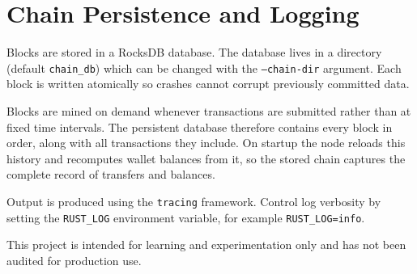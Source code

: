\chapter{Chain Persistence and Logging}
Blocks are stored in a RocksDB database. The database lives in a directory (default \texttt{chain\_db}) which can be changed with the \texttt{--chain-dir} argument. Each block is written atomically so crashes cannot corrupt previously committed data.

Blocks are mined on demand whenever transactions are submitted rather than at fixed time intervals. The persistent database therefore contains every block in order, along with all transactions they include. On startup the node reloads this history and recomputes wallet balances from it, so the stored chain captures the complete record of transfers and balances.

Output is produced using the \texttt{tracing} framework. Control log verbosity by setting the \texttt{RUST\_LOG} environment variable, for example \texttt{RUST\_LOG=info}.

This project is intended for learning and experimentation only and has not been audited for production use.
